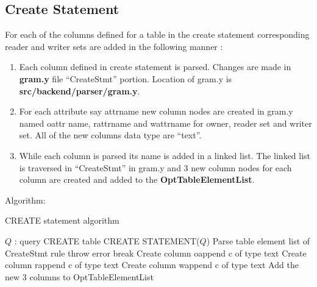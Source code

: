 \documentclass[11pt,a4paper]{report}
\begin{document}

\subsection{Create Statement}
For each of the columns defined for a table in the create statement corresponding reader and writer sets are added in the following manner : 
\begin{enumerate}
    \item Each column defined in create statement is parsed. Changes are made in \textbf{gram.y} file “CreateStmt” portion. Location of gram.y is \textbf{src/backend/parser/gram.y}.
    \item For each attribute say attr\textunderscore name new column nodes are created in gram.y named o\textunderscore attr \textunderscore name, r\textunderscore attr\textunderscore name and w\textunderscore attr\textunderscore name for owner, reader set and writer set. All of the new columns data type are “text”. 
    \item While each column is parsed its name is added in a linked list. The linked list is traversed in “CreateStmt” in gram.y and  3 new column nodes for  each column are created and added to the \textbf{OptTableElementList}.
\end{enumerate}

Algorithm: 
\begin{algorithm}[H]
\caption{CREATE statement algorithm}
\renewcommand{\algorithmicrequire}{\textbf{Inputs:}}
\begin{algorithmic}[1]
\REQUIRE $Q$ : query
\ENSURE CREATE table 
\STATE CREATE STATEMENT($Q$)  
  \STATE Parse table element list of CreateStmt rule
   \STATE throw error
   \STATE break
   \ELSE
   \STATE Create column o\textunderscore  append c of type text
   \STATE Create column r\textunderscore  append c of type text
   \STATE Create column w\textunderscore  append c of type text
   \STATE Add the new 3 columns to OptTableElementList
   \ENDIF
   \ENDFOR
\end{algorithmic}
\end{algorithm}
\end{document}
